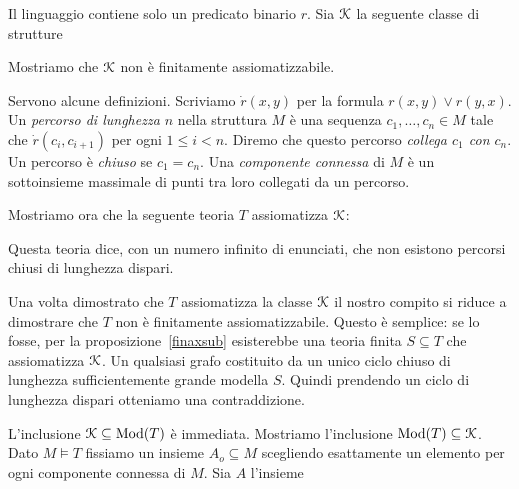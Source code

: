 \begin{example}
Il linguaggio contiene solo un predicato binario $r$. Sia $\EuScript K$ la seguente classe di strutture




Mostriamo che $\EuScript K$ non \`e finitamente assiomatizzabile.

Servono alcune definizioni. Scriviamo $\dot r(x,y)$ per la formula $r(x,y)\vee r(y,x)$. Un \textit{percorso di lunghezza $n$} nella struttura $M$ \`e una sequenza $c_1,\dots,c_n\in M$ tale che $\dot r(c_i,c_{i+1})$ per ogni $1\le i<n$. Diremo che questo percorso \textit{collega $c_1$ con $c_n$}. Un percorso \`e \textit{chiuso\/} se $c_1=c_n$. Una \textit{componente connessa\/} di $M$ \`e un sottoinsieme massimale di punti tra loro collegati da un percorso.

Mostriamo ora che la seguente teoria $T$ assiomatizza $\EuScript K$:


Questa teoria dice, con un numero infinito di enunciati, che non esistono percorsi chiusi di lunghezza dispari. 

Una volta dimostrato che $T$ assiomatizza la classe $\EuScript K$ il nostro compito si riduce a dimostrare che $T$ non \`e finitamente assiomatizzabile. Questo \`e semplice: se lo fosse, per la proposizione~\ref{finaxsub} esisterebbe una teoria finita $S\subseteq T$ che assiomatizza $\EuScript K$. Un qualsiasi grafo costituito da un unico ciclo chiuso di lunghezza sufficientemente grande modella $S$. Quindi prendendo un ciclo di lunghezza dispari otteniamo una contraddizione.

L'inclusione $\EuScript K\subseteq\mathop\textrm{Mod}(T)$ \`e immediata. Mostriamo l'inclusione $\mathop\textrm{Mod}(T)\subseteq\EuScript K$. Dato $M\models T$ fissiamo un insieme $A_o\subseteq M$ scegliendo esattamente un elemento per ogni componente connessa di $M$. %
Sia $A$ l'insieme 



\end{example}

